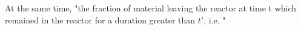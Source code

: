 At the same time, "the fraction of material leaving the reactor at time t which remained in the reactor for a duration greater than $t'$, i.e. "  